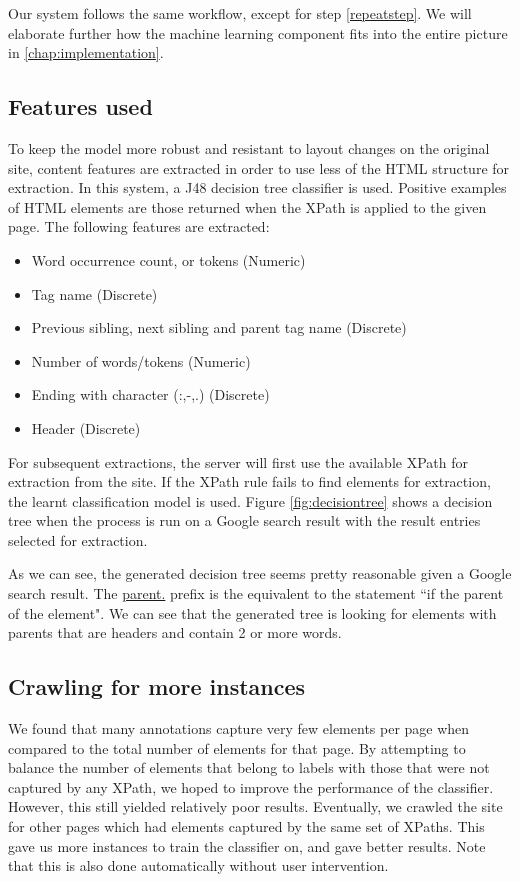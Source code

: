 Our system follows the same workflow, except for step \ref{repeatstep}. We will elaborate further
how the machine learning component fits into the entire picture in \ref{chap:implementation}.

\subsection{Features used}
To keep the model more robust and resistant to layout changes on the original site, content features are extracted in order to use less of the HTML structure for extraction. In this system, a J48 decision tree classifier is used. Positive examples of HTML elements are those returned when the XPath is applied to the given page. The following features are extracted:

	\begin{itemize}
		\item Word occurrence count, or tokens (Numeric)
		\item Tag name (Discrete)
		\item Previous sibling, next sibling and parent tag name (Discrete)
		\item Number of words/tokens (Numeric)
		\item Ending with character (:,-,.) (Discrete)
		\item Header (Discrete)
	\end{itemize}
	

	
	
	For subsequent extractions, the server will first use the available XPath for extraction from the site.
	If the XPath rule fails to find elements for extraction, the learnt classification model is used. Figure
	\ref{fig:decisiontree} shows a decision tree when the process is run on a Google search result with the
	result entries selected for extraction.


	
	As we can see, the generated decision tree seems pretty reasonable given a Google search result. The
	\url{parent.}	prefix is the equivalent to the statement ``if the parent of the element". We can see
	that the generated tree is looking for elements with parents that are headers and contain 2 or more words.
	
\subsection{Crawling for more instances}
	We found that many annotations capture very few elements per page when
	compared to the total number of elements for that page. By attempting
	to balance the number of elements that belong to labels with those that
	were not captured by any XPath, we hoped to improve the performance of
	the classifier. However, this still yielded relatively poor results.
	Eventually, we crawled the site for other pages which had elements captured
	by the same set of XPaths. This gave us more instances to train the
	classifier on, and gave better results. Note that this is also done automatically
	without user intervention.
	
